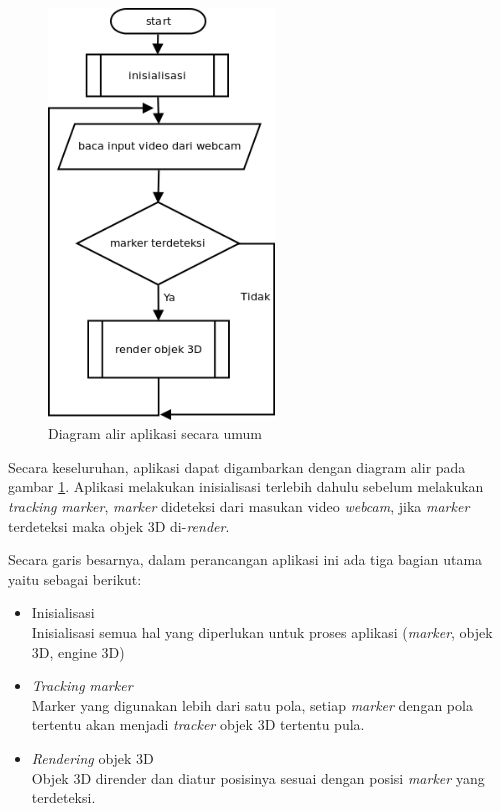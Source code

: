 \begin{figure}[h]
\begin{center}
\includegraphics[width=6cm]{./images/flowchart/aplikasi}
\caption{\label{fig:flowchart_aplikasi} Diagram alir aplikasi secara umum}
\end{center}
\end{figure}

Secara keseluruhan, aplikasi dapat digambarkan dengan diagram alir pada gambar \ref{fig:flowchart_aplikasi}. Aplikasi melakukan inisialisasi terlebih dahulu sebelum melakukan \textit{tracking} \textit{marker}, \textit{marker} dideteksi dari masukan video \textit{webcam}, jika \textit{marker} terdeteksi maka objek 3D di-\textit{render}. 

Secara garis besarnya, dalam perancangan aplikasi ini ada tiga bagian utama yaitu sebagai berikut:
\nopagebreak
\begin{itemize}
\item Inisialisasi\\
Inisialisasi semua hal yang diperlukan untuk proses aplikasi (\textit{marker}, objek 3D, engine 3D)
\item \textit{Tracking} \textit{marker}\\
Marker yang digunakan lebih dari satu pola, setiap \textit{marker} dengan pola tertentu akan menjadi \textit{tracker} objek 3D tertentu pula.
\item \textit{Rendering} objek 3D\\
Objek 3D dirender dan diatur posisinya sesuai dengan posisi \textit{marker} yang terdeteksi.
\end{itemize}

